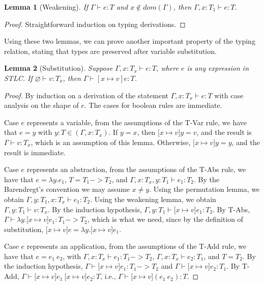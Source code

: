 \documentclass[tese,capa,english]{texufpel}
\newtheorem{lemma}{Lemma}
\begin{document}
\begin{lemma}[Weakening]
If $\Gamma \vdash e : T$ and $x \notin dom(\Gamma)$, then $\Gamma, x : T_1 \vdash e : T$.
\end{lemma}

\begin{proof}
Straightforward induction on typing derivations.
\end{proof}

Using these two lemmas, we can prove another important property of the typing relation, stating that types are preserved after variable substitution.

\begin{lemma}[Substitution]
Suppose $\Gamma , x : T_x \vdash e : T$, where $e$ is any expression in STLC. If $\varnothing \vdash v : T_x$, then $\Gamma \vdash [x \mapsto v] e : T$.
\end{lemma}

\begin{proof}
  By induction on a derivation of the statement $\Gamma , x : T_x \vdash e : T$ with case analysis on the shape of $e$. The cases for boolean rules are immediate. \vspace{3pt}

  Case $e$ represents a variable, from the assumptions of the {\footnotesize T-Var} rule, we have that $e = y$ with $y : T \in (\Gamma , x : T_x)$. If $y = x$, then $\lbrack x \mapsto v \rbrack y = v$, and the result is $\Gamma \vdash v : T_x$, which is an assumption of this lemma. Otherwise, $\lbrack x \mapsto v \rbrack y = y$, and the result is immediate.

  Case $e$ represents an abstraction, from the assumptions of the {\footnotesize T-Abs} rule, we have that $e = \lambda y . e_1$, $T = T_1 -> T_2$, and $\Gamma , x : T_x , y : T_1 \vdash e_1 : T_2$. By the Barendregt's convention we may assume $x \neq y$. Using the permutation lemma, we obtain $\Gamma , y : T_1 , x : T_x \vdash e_1 : T_2$. Using the weakening lemma, we obtain $\Gamma , y : T_1 \vdash v : T_x$. By the induction hypothesis, $\Gamma, y : T_1 \vdash \lbrack x \mapsto v \rbrack e_1 : T_2$. By {\footnotesize T-Abs}, $\Gamma \vdash \lambda y . \lbrack x \mapsto v \rbrack e_1 : T_1 -> T_2$, which is what we need, since by the definition of substitution, $\lbrack x \mapsto v \rbrack e = \lambda y . \lbrack x \mapsto v \rbrack e_1$.
  
  Case $e$ represents an application, from the assumptions of the {\footnotesize T-Add} rule, we have that $e = e_1 ~ e_2$, with $\Gamma , x : T_x \vdash e_1 : T_1 -> T_2$, $\Gamma , x : T_x \vdash e_2 : T_1$, and $T = T_2$. By the induction hypothesis, $\Gamma \vdash \lbrack x \mapsto v \rbrack e_1 : T_1 -> T_2$ and $\Gamma \vdash \lbrack x \mapsto v \rbrack e_2 : T_1$. By {\footnotesize T-Add}, $\Gamma \vdash \lbrack x \mapsto v \rbrack e_1 ~ \lbrack x \mapsto v \rbrack e_2 : T$, i.e., $\Gamma \vdash \lbrack x \mapsto v \rbrack (e_1 ~ e_2) : T$.
\end{proof}
\end{document}
